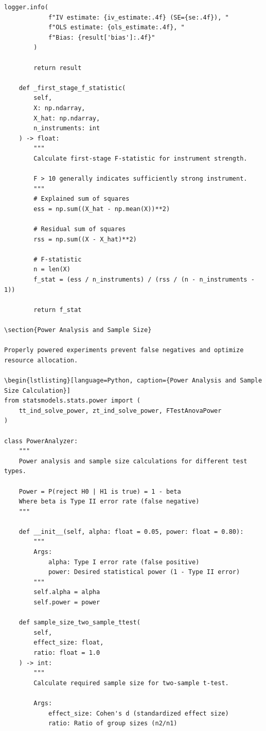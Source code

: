 \begin{lstlisting}[style=python, caption={DAG-based causal inference with backdoor criterion}]
        logger.info(
            f"IV estimate: {iv_estimate:.4f} (SE={se:.4f}), "
            f"OLS estimate: {ols_estimate:.4f}, "
            f"Bias: {result['bias']:.4f}"
        )

        return result

    def _first_stage_f_statistic(
        self,
        X: np.ndarray,
        X_hat: np.ndarray,
        n_instruments: int
    ) -> float:
        """
        Calculate first-stage F-statistic for instrument strength.

        F > 10 generally indicates sufficiently strong instrument.
        """
        # Explained sum of squares
        ess = np.sum((X_hat - np.mean(X))**2)

        # Residual sum of squares
        rss = np.sum((X - X_hat)**2)

        # F-statistic
        n = len(X)
        f_stat = (ess / n_instruments) / (rss / (n - n_instruments - 1))

        return f_stat

\section{Power Analysis and Sample Size}

Properly powered experiments prevent false negatives and optimize resource allocation.

\begin{lstlisting}[language=Python, caption={Power Analysis and Sample Size Calculation}]
from statsmodels.stats.power import (
    tt_ind_solve_power, zt_ind_solve_power, FTestAnovaPower
)

class PowerAnalyzer:
    """
    Power analysis and sample size calculations for different test types.

    Power = P(reject H0 | H1 is true) = 1 - beta
    Where beta is Type II error rate (false negative)
    """

    def __init__(self, alpha: float = 0.05, power: float = 0.80):
        """
        Args:
            alpha: Type I error rate (false positive)
            power: Desired statistical power (1 - Type II error)
        """
        self.alpha = alpha
        self.power = power

    def sample_size_two_sample_ttest(
        self,
        effect_size: float,
        ratio: float = 1.0
    ) -> int:
        """
        Calculate required sample size for two-sample t-test.

        Args:
            effect_size: Cohen's d (standardized effect size)
            ratio: Ratio of group sizes (n2/n1)


\end{lstlisting}

